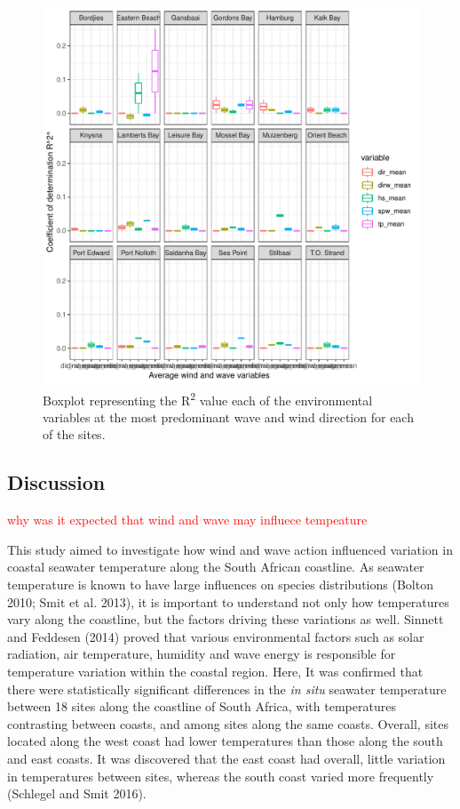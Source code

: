 \documentclass[12pt,A4paper,]{article}
\begin{document}
\begin{figure}
\centering
\includegraphics{../figures/predominant_ww.pdf}
\caption{Boxplot representing the R\textsuperscript{2} value each of the
environmental variables at the most predominant wave and wind direction
for each of the sites.}
\end{figure}

\subsection{Discussion}\label{discussion}

\textcolor{red}{why was it expected that wind and wave may influece tempeature}

This study aimed to investigate how wind and wave action influenced
variation in coastal seawater temperature along the South African
coastline. As seawater temperature is known to have large influences on
species distributions (Bolton 2010; Smit et al. 2013), it is important
to understand not only how temperatures vary along the coastline, but
the factors driving these variations as well. Sinnett and Feddesen
(2014) proved that various environmental factors such as solar
radiation, air temperature, humidity and wave energy is responsible for
temperature variation within the coastal region. Here, It was confirmed
that there were statistically significant differences in the \emph{in
situ} seawater temperature between 18 sites along the coastline of South
Africa, with temperatures contrasting between coasts, and among sites
along the same coasts. Overall, sites located along the west coast had
lower temperatures than those along the south and east coasts. It was
discovered that the east coast had overall, little variation in
temperatures between sites, whereas the south coast varied more
frequently (Schlegel and Smit 2016).
\end{document}
